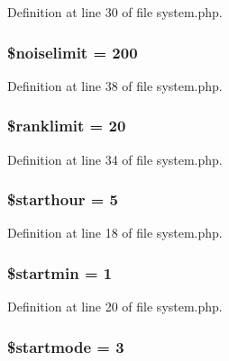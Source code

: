 Definition at line 30 of file system.\+php.

\hypertarget{system_8php_a4dc0fb7ebf5e68f895dcc96b970c2a75}{
\subsubsection[{\$noiselimit}]{\setlength{\rightskip}{0pt plus 5cm}\$noiselimit = 200}}\label{system_8php_a4dc0fb7ebf5e68f895dcc96b970c2a75}


Definition at line 38 of file system.\+php.

\hypertarget{system_8php_afa3b8f992d71ff31a70916aba6d974c1}{
\subsubsection[{\$ranklimit}]{\setlength{\rightskip}{0pt plus 5cm}\$ranklimit = 20}}\label{system_8php_afa3b8f992d71ff31a70916aba6d974c1}


Definition at line 34 of file system.\+php.

\hypertarget{system_8php_aeef46eda5e8dd04090e31a665bd5122e}{
\subsubsection[{\$starthour}]{\setlength{\rightskip}{0pt plus 5cm}\$starthour = 5}}\label{system_8php_aeef46eda5e8dd04090e31a665bd5122e}


Definition at line 18 of file system.\+php.

\hypertarget{system_8php_abb5a90eac0af0eb8651a13cdedd47b52}{
\subsubsection[{\$startmin}]{\setlength{\rightskip}{0pt plus 5cm}\$startmin = 1}}\label{system_8php_abb5a90eac0af0eb8651a13cdedd47b52}


Definition at line 20 of file system.\+php.

\hypertarget{system_8php_a84f9748242bbe59e5def222a1f731a86}{
\subsubsection[{\$startmode}]{\setlength{\rightskip}{0pt plus 5cm}\$startmode = 3}}\label{system_8php_a84f9748242bbe59e5def222a1f731a86}


